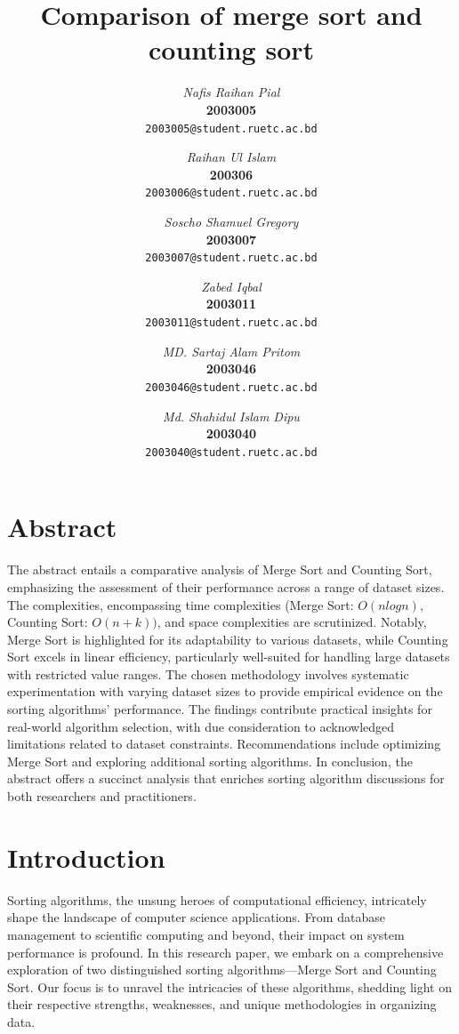 \documentclass[12pt,twocolumn]{article}
\newcommand{\authorinfo}[3]{
    {\fontsize{12pt}{14pt}\selectfont \textit{#1}} \\ %
    {\fontsize{12pt}{14pt}\selectfont \textbf{#2}} \\ %
    {\fontsize{12pt}{14pt}\selectfont \texttt{#3}} \vspace{1em} %
}
\begin{document}
\title{Comparison of merge sort and counting sort}
\date{} %

\author{
    \authorinfo{Nafis Raihan Pial}{2003005}{2003005@student.ruetc.ac.bd} \and
    \authorinfo{Raihan Ul Islam}{200306}{2003006@student.ruetc.ac.bd} \and
    \authorinfo{Soscho Shamuel Gregory}{2003007}{2003007@student.ruetc.ac.bd} \and
    \authorinfo{Zabed Iqbal}{2003011}{2003011@student.ruetc.ac.bd} \and
    \authorinfo{MD. Sartaj Alam Pritom}{2003046}{2003046@student.ruetc.ac.bd} \and
    \authorinfo{Md. Shahidul Islam Dipu}{2003040}{2003040@student.ruetc.ac.bd}
}
\maketitle


\section{Abstract}
 The abstract entails a comparative analysis of Merge Sort and Counting Sort, emphasizing the assessment of their performance across a range of dataset sizes. The complexities, encompassing time complexities (Merge Sort: \(O(nlogn)\), Counting Sort: \(O(n+k))\), and space complexities are scrutinized. Notably, Merge Sort is highlighted for its adaptability to various datasets, while Counting Sort excels in linear efficiency, particularly well-suited for handling large datasets with restricted value ranges. The chosen methodology involves systematic experimentation with varying dataset sizes to provide empirical evidence on the sorting algorithms' performance. The findings contribute practical insights for real-world algorithm selection, with due consideration to acknowledged limitations related to dataset constraints. Recommendations include optimizing Merge Sort and exploring additional sorting algorithms. In conclusion, the abstract offers a succinct analysis that enriches sorting algorithm discussions for both researchers and practitioners.

\section{Introduction}
Sorting algorithms, the unsung heroes of computational efficiency, intricately shape the landscape of computer science applications. From database management to scientific computing and beyond, their impact on system performance is profound. In this research paper, we embark on a comprehensive exploration of two distinguished sorting algorithms—Merge Sort and Counting Sort. Our focus is to unravel the intricacies of these algorithms, shedding light on their respective strengths, weaknesses, and unique methodologies in organizing data.
\end{document}

